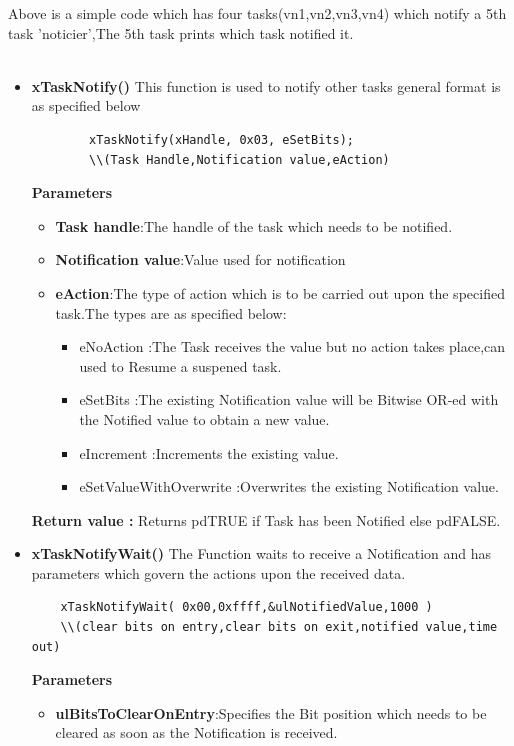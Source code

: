 \documentclass[11pt,a4paper]{article}
\begin{document}
   Above is a simple code which has four tasks(vn1,vn2,vn3,vn4) which notify a 5th task 'noticier',The 5th task prints which task notified it. 
   \\
   \\
   \begin{itemize}
   	\item \textbf{xTaskNotify()}
   	This function is used to notify other tasks general format is as specified below 
   		\begin{lstlisting}
   		xTaskNotify(xHandle, 0x03, eSetBits);
   		\\(Task Handle,Notification value,eAction)
   		\end{lstlisting}
  
  
   	\textbf{Parameters}
   	\begin{itemize}
   		\item \textbf{Task handle}:The handle of the task which needs to be notified.
   		\item \textbf{Notification value}:Value used for notification
   		\item \textbf{eAction}:The type of action which is to be carried out upon the specified task.The types are as specified below:
		   		\begin{itemize}
		   			\item eNoAction :The Task receives the value but no action takes place,can used to Resume a suspened task.
		   			
		   			\item eSetBits :The existing Notification value will be Bitwise OR-ed with the Notified value to obtain a new value.
		   			
		   			\item eIncrement :Increments the existing value.
		   			
		   			\item eSetValueWithOverwrite :Overwrites the existing Notification value.
		   			
		   			
		   		\end{itemize}
		   		
   	\end{itemize}
   	
   	\textbf{Return value :}
   	  	Returns pdTRUE if Task has been Notified else pdFALSE.
   	
   	\item \textbf{xTaskNotifyWait() } The Function waits to receive a Notification and has parameters which govern the actions upon the received data.
   	\begin{lstlisting}
   	xTaskNotifyWait( 0x00,0xffff,&ulNotifiedValue,1000 )
   	\\(clear bits on entry,clear bits on exit,notified value,time out)
   	\end{lstlisting}
   	\textbf{Parameters}
   	\begin{itemize}
   		\item \textbf{ulBitsToClearOnEntry}:Specifies the Bit position which needs to be cleared as soon as the Notification is received.
   	    

\end{itemize}
\end{itemize}
\end{document}
